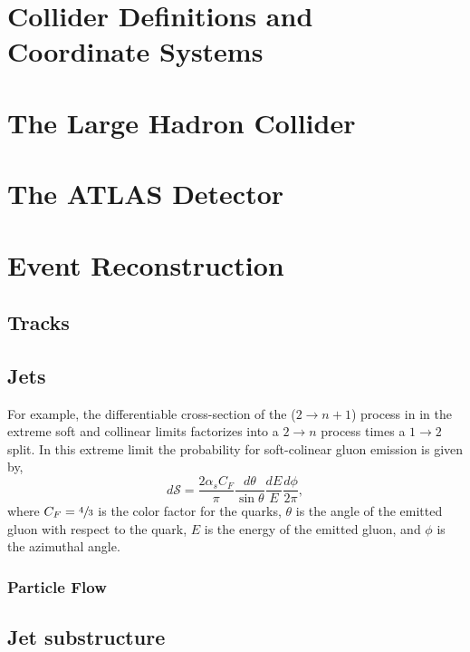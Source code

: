 
\section{Collider Definitions and Coordinate Systems}

\section{The Large Hadron Collider}

\section{The ATLAS Detector}

\section{Event Reconstruction}
\label{sec:event_reconstruction}

\subsection{Tracks}

\subsection{Jets}

For example, the differentiable cross-section of the ($2\rightarrow n+1$) process in  in the extreme soft and collinear limits factorizes into a $2 \rightarrow n$ process times a $1 \rightarrow 2$ split.
In this extreme limit the probability for soft-colinear gluon emission is given by,
\begin{equation}
	\label{eq:gluon_emission}
	d \mathcal{S} = \frac{2 \alpha_s C_F}{\pi} \frac{d \theta}{\sin\theta} \frac{dE}{E} \frac{d\phi}{2\pi},
\end{equation}
where $C_F = \sfrac{4}{3}$ is the color factor for the quarks, $\theta$ is the angle of the emitted gluon with respect to the quark, $E$ is the energy of the emitted gluon, and $\phi$ is the azimuthal angle.

\subsubsection{Particle Flow}
\label{sec:particle_flow}


\subsection{Jet substructure}
\label{sec:jet_substructure}

